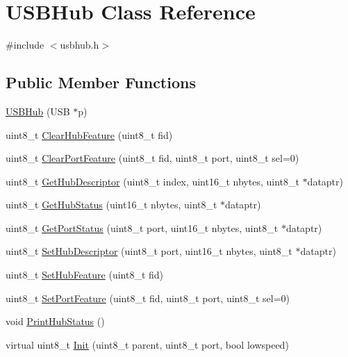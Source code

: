 \hypertarget{class_u_s_b_hub}{\section{\-U\-S\-B\-Hub \-Class \-Reference}
\label{class_u_s_b_hub}
}


{\ttfamily \#include $<$usbhub.\-h$>$}

\subsection*{\-Public \-Member \-Functions}
\begin{DoxyCompactItemize}
\item 
\hyperlink{class_u_s_b_hub_afa7488b7d65926158f6a029ebf40905c}{\-U\-S\-B\-Hub} (\-U\-S\-B $\ast$p)
\item 
uint8\-\_\-t \hyperlink{class_u_s_b_hub_afc935651055e4ac1e51575218a51de43}{\-Clear\-Hub\-Feature} (uint8\-\_\-t fid)
\item 
uint8\-\_\-t \hyperlink{class_u_s_b_hub_a03c4dce66fbb4b66be9eda8c9b6f5ce4}{\-Clear\-Port\-Feature} (uint8\-\_\-t fid, uint8\-\_\-t port, uint8\-\_\-t sel=0)
\item 
uint8\-\_\-t \hyperlink{class_u_s_b_hub_a73abd87f87d6e2982070bc5bb0183e0d}{\-Get\-Hub\-Descriptor} (uint8\-\_\-t index, uint16\-\_\-t nbytes, uint8\-\_\-t $\ast$dataptr)
\item 
uint8\-\_\-t \hyperlink{class_u_s_b_hub_a626974bb00cfbd5052c8d7e897a9a9d6}{\-Get\-Hub\-Status} (uint16\-\_\-t nbytes, uint8\-\_\-t $\ast$dataptr)
\item 
uint8\-\_\-t \hyperlink{class_u_s_b_hub_a01c0b9d64fd5314963e7d7f70c0a99c3}{\-Get\-Port\-Status} (uint8\-\_\-t port, uint16\-\_\-t nbytes, uint8\-\_\-t $\ast$dataptr)
\item 
uint8\-\_\-t \hyperlink{class_u_s_b_hub_a447ea8659279ca7ac99f93d33b426260}{\-Set\-Hub\-Descriptor} (uint8\-\_\-t port, uint16\-\_\-t nbytes, uint8\-\_\-t $\ast$dataptr)
\item 
uint8\-\_\-t \hyperlink{class_u_s_b_hub_a933658683f6590cd40ff97d08095f5a2}{\-Set\-Hub\-Feature} (uint8\-\_\-t fid)
\item 
uint8\-\_\-t \hyperlink{class_u_s_b_hub_ac071f6cf69d0113151f481405f338ce0}{\-Set\-Port\-Feature} (uint8\-\_\-t fid, uint8\-\_\-t port, uint8\-\_\-t sel=0)
\item 
void \hyperlink{class_u_s_b_hub_ac705ffc671398ec2170820c1bb16b77c}{\-Print\-Hub\-Status} ()
\item 
virtual uint8\-\_\-t \hyperlink{class_u_s_b_hub_ab2b2e257556e3d59f9258dd84d6f636e}{\-Init} (uint8\-\_\-t parent, uint8\-\_\-t port, bool lowspeed)

\end{DoxyCompactItemize}
